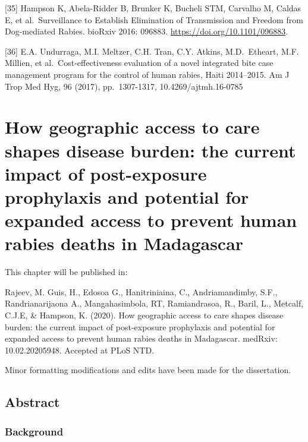 \documentclass[
]{book}
\begin{document}
{[}35{]} Hampson K, Abela-Ridder B, Brunker K, Bucheli STM, Carvalho M, Caldas E, et al.~Surveillance to Establish Elimination of Transmission and Freedom from Dog-mediated Rabies. bioRxiv 2016: 096883. \url{https://doi.org/10.1101/096883}.

{[}36{]} E.A. Undurraga, M.I. Meltzer, C.H. Tran, C.Y. Atkins, M.D.~Etheart, M.F. Millien, et al.~Cost-effectiveness evaluation of a novel integrated bite case management program for the control of human rabies, Haiti 2014--2015. Am J Trop Med Hyg, 96 (2017), pp.~1307-1317, 10.4269/ajtmh.16-0785

\hypertarget{how-geographic-access-to-care-shapes-disease-burden-the-current-impact-of-post-exposure-prophylaxis-and-potential-for-expanded-access-to-prevent-human-rabies-deaths-in-madagascar}{%
\chapter{How geographic access to care shapes disease burden: the current impact of post-exposure prophylaxis and potential for expanded access to prevent human rabies deaths in Madagascar}\label{how-geographic-access-to-care-shapes-disease-burden-the-current-impact-of-post-exposure-prophylaxis-and-potential-for-expanded-access-to-prevent-human-rabies-deaths-in-madagascar}}

This chapter will be published in:

Rajeev, M. Guis, H., Edosoa G., Hanitriniaina, C., Andriamandimby, S.F., Randrianarijaona A., Mangahasimbola, RT, Ramiandrasoa, R., Baril, L., Metcalf, C.J.E, \& Hampson, K. (2020). How geographic access to care shapes disease burden: the current impact of post-exposure prophylaxis and potential for expanded access to prevent human rabies deaths in Madagascar. medRxiv: 10.02.20205948. Accepted at PLoS NTD.

Minor formatting modifications and edits have been made for the dissertation.

\hypertarget{abstract-1}{%
\section*{Abstract}\label{abstract-1}}

\hypertarget{background}{%
\subsection*{Background}\label{background}}
\end{document}
